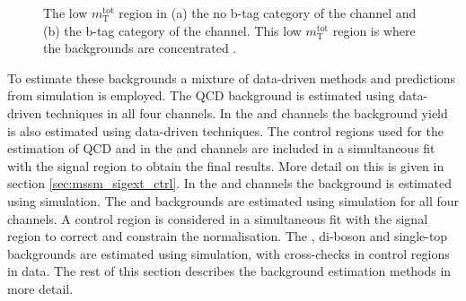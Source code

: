 \begin{figure}[h!]
\begin{center}
\end{center}
\caption[The low \mTtot~region in the no b-tag category of the \mutau channel 
and in the b-tag category of the \emu channel.]{The low $m_{\text{T}}^{\text{tot}}$ region in (a) the 
no b-tag category of the \mutau channel and (b) the b-tag category of the \emu channel.
This low $m_{\text{T}}^{\text{tot}}$ region is where the backgrounds
are concentrated \cite{CMS-PAS-HIG-16-037-addit}.}
\label{fig:mssm_bkgs_overview}
\end{figure}

To estimate these backgrounds a mixture of data-driven 
methods and predictions from simulation is employed. The QCD background
is estimated using data-driven techniques in all four channels.
In the \mutau and \etau channels the \Wjets background yield is also
estimated using data-driven techniques. The control regions used
for the estimation of QCD and \Wjets in the \etau and \mutau channels
are included in a simultaneous fit with the signal region to obtain
the final results. More detail on this is given in section \ref{sec:mssm_sigext_ctrl}.
In the \emu and \tautau channels the \Wjets background is estimated using
simulation. The \Ztautau and \Zellell backgrounds are estimated
using simulation for all four channels. A \Zmm control region
is considered in a simultaneous fit with the signal region to correct and
constrain the \Ztautau normalisation.
The \ttbar, di-boson and single-top backgrounds are estimated
using simulation, with cross-checks in control regions in data.
The rest of this section describes the background estimation methods
in more detail.

